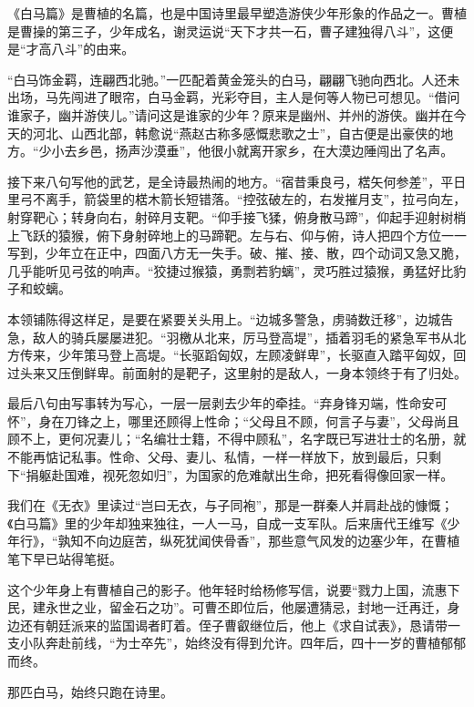 \begin{appreciation}
《白马篇》是曹植的名篇，也是中国诗里最早塑造游侠少年形象的作品之一。曹植是曹操的第三子，少年成名，谢灵运说“天下才共一石，曹子建独得八斗”，这便是“才高八斗”的由来。

“白马饰金羁，连翩西北驰。”一匹配着黄金笼头的白马，翩翩飞驰向西北。人还未出场，马先闯进了眼帘，白马金羁，光彩夺目，主人是何等人物已可想见。“借问谁家子，幽并游侠儿。”请问这是谁家的少年？原来是幽州、并州的游侠。幽并在今天的河北、山西北部，韩愈说“燕赵古称多感慨悲歌之士”，自古便是出豪侠的地方。“少小去乡邑，扬声沙漠垂”，他很小就离开家乡，在大漠边陲闯出了名声。

接下来八句写他的武艺，是全诗最热闹的地方。“宿昔秉良弓，楛矢何参差”，平日里弓不离手，箭袋里的楛木箭长短错落。“控弦破左的，右发摧月支”，拉弓向左，射穿靶心；转身向右，射碎月支靶。“仰手接飞猱，俯身散马蹄”，仰起手迎射树梢上飞跃的猿猴，俯下身射碎地上的马蹄靶。左与右、仰与俯，诗人把四个方位一一写到，少年立在正中，四面八方无一失手。破、摧、接、散，四个动词又急又脆，几乎能听见弓弦的响声。“狡捷过猴猿，勇剽若豹螭”，灵巧胜过猿猴，勇猛好比豹子和蛟螭。

本领铺陈得这样足，是要在紧要关头用上。“边城多警急，虏骑数迁移”，边城告急，敌人的骑兵屡屡进犯。“羽檄从北来，厉马登高堤”，插着羽毛的紧急军书从北方传来，少年策马登上高堤。“长驱蹈匈奴，左顾凌鲜卑”，长驱直入踏平匈奴，回过头来又压倒鲜卑。前面射的是靶子，这里射的是敌人，一身本领终于有了归处。

最后八句由写事转为写心，一层一层剥去少年的牵挂。“弃身锋刃端，性命安可怀”，身在刀锋之上，哪里还顾得上性命；“父母且不顾，何言子与妻”，父母尚且顾不上，更何况妻儿；“名编壮士籍，不得中顾私”，名字既已写进壮士的名册，就不能再惦记私事。性命、父母、妻儿、私情，一样一样放下，放到最后，只剩下“捐躯赴国难，视死忽如归”，为国家的危难献出生命，把死看得像回家一样。

我们在《无衣》里读过“岂曰无衣，与子同袍”，那是一群秦人并肩赴战的慷慨；《白马篇》里的少年却独来独往，一人一马，自成一支军队。后来唐代王维写《少年行》，“孰知不向边庭苦，纵死犹闻侠骨香”，那些意气风发的边塞少年，在曹植笔下早已站得笔挺。

这个少年身上有曹植自己的影子。他年轻时给杨修写信，说要“戮力上国，流惠下民，建永世之业，留金石之功”。可曹丕即位后，他屡遭猜忌，封地一迁再迁，身边还有朝廷派来的监国谒者盯着。侄子曹叡继位后，他上《求自试表》，恳请带一支小队奔赴前线，“为士卒先”，始终没有得到允许。四年后，四十一岁的曹植郁郁而终。

那匹白马，始终只跑在诗里。
\end{appreciation}

